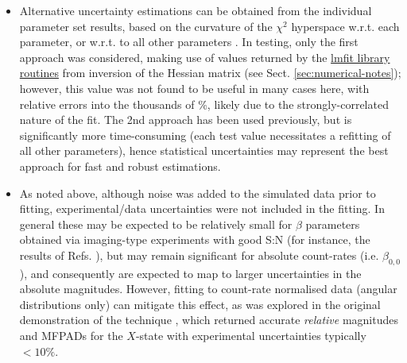 \documentclass[10pt]{article}
\begin{document}
\begin{itemize}
\item Alternative uncertainty estimations can be obtained from the individual parameter set results, based on the curvature of the $\chi^2$ hyperspace w.r.t. each parameter, or w.r.t. to all other parameters \cite{HockettThesis,Bevington1992}. In testing, only the first approach was considered, making use of values returned by the \href{https://lmfit.github.io/lmfit-py/fitting.html#uncertainties-in-variable-parameters-and-their-correlations}{lmfit library routines} \cite{LMFITDocumentation} from inversion of the Hessian matrix (see Sect. \ref{sec:numerical-notes}); however, this value was not found to be useful in many cases here, with relative errors into the thousands of \%, likely due to the strongly-correlated nature of the fit. The 2nd approach has been used previously, but is significantly more time-consuming (each test value necessitates a refitting of all other parameters), hence statistical uncertainties may represent the best approach for fast and robust estimations.
\item As noted above, although noise was added to the simulated data prior to fitting, experimental/data uncertainties were not included in the fitting. In general these may be expected to be relatively small for $\beta$ parameters obtained via imaging-type experiments with good S:N (for instance, the results of Refs. \cite{HockettThesis,marceau2017MolecularFrameReconstruction}), but may remain significant for absolute count-rates (i.e. $\beta_{0,0}$), and consequently are expected to map to larger uncertainties in the absolute magnitudes. However, fitting to count-rate normalised data (angular distributions only) can mitigate this effect, as was explored in the original demonstration of the technique \cite{marceau2017MolecularFrameReconstruction}, which returned accurate \textit{relative} magnitudes and MFPADs for the $X$-state with experimental uncertainties typically $<10\%$.
\end{itemize}




\end{document}
